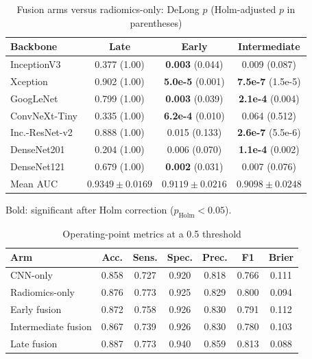 \documentclass[conference]{IEEEtran}
\begin{document}
\begin{table}[t]
\caption{Fusion arms versus radiomics-only: DeLong $p$ (Holm-adjusted $p$ in parentheses)}
\label{tab:delong}
\centering
\footnotesize
\setlength{\tabcolsep}{3pt}
\begin{tabular}{@{}lccc@{}}
\toprule
Backbone & Late & Early & Intermediate \\
\midrule
InceptionV3 & 0.377 (1.00) & \textbf{0.003} (0.044) & 0.009 (0.087) \\
Xception & 0.902 (1.00) & \textbf{5.0e-5} (0.001) & \textbf{7.5e-7} (1.5e-5) \\
GoogLeNet & 0.799 (1.00) & \textbf{0.003} (0.039) & \textbf{2.1e-4} (0.004) \\
ConvNeXt-Tiny & 0.335 (1.00) & \textbf{6.2e-4} (0.010) & 0.064 (0.512) \\
Inc.-ResNet-v2 & 0.888 (1.00) & 0.015 (0.133) & \textbf{2.6e-7} (5.5e-6) \\
DenseNet201 & 0.204 (1.00) & 0.006 (0.070) & \textbf{1.1e-4} (0.002) \\
DenseNet121 & 0.679 (1.00) & \textbf{0.002} (0.031) & 0.007 (0.076) \\
\midrule
Mean AUC & $0.9349\pm0.0169$ & $0.9119\pm0.0216$ & $0.9098\pm0.0248$ \\
\bottomrule
\end{tabular}
\vspace{2pt}

\raggedright\footnotesize Bold: significant after Holm correction ($p_{\mathrm{Holm}}<0.05$).
\end{table}


\begin{table}[t]
\caption{Operating-point metrics at a 0.5 threshold}
\label{tab:metrics}
\centering
\scriptsize
\setlength{\tabcolsep}{3pt}
\begin{tabular}{@{}lcccccc@{}}
\toprule
Arm & Acc. & Sens. & Spec. & Prec. & F1 & Brier \\
\midrule
CNN-only & 0.858 & 0.727 & 0.920 & 0.818 & 0.766 & 0.111 \\
Radiomics-only & 0.876 & 0.773 & 0.925 & 0.829 & 0.800 & 0.094 \\
Early fusion & 0.872 & 0.758 & 0.926 & 0.830 & 0.791 & 0.112 \\
Intermediate fusion & 0.867 & 0.739 & 0.926 & 0.830 & 0.780 & 0.103 \\
Late fusion & 0.887 & 0.773 & 0.940 & 0.859 & 0.813 & 0.088 \\
\bottomrule
\end{tabular}
\end{table}
\end{document}
